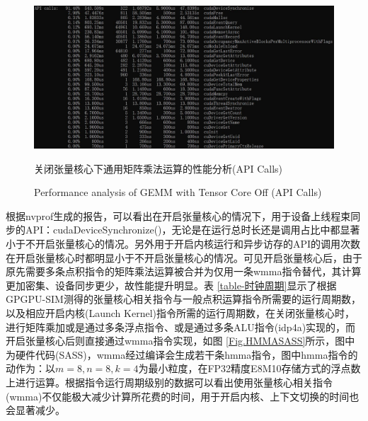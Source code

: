 \begin{figure}
	\centering
	\includegraphics[width=15cm]{figures/GEMM-NOTF.jpg}
	\renewcommand{\thefigure}{\arabic{section}-\arabic{figure} }
	\renewcommand{\figurename}{图}
	\caption{关闭张量核心下通用矩阵乘法运算的性能分析(API Calls)}
	\addtocounter{figure}{-1}
	\renewcommand{\thefigure}{\arabic{section}-\arabic{figure} }
	\renewcommand{\figurename}{Figure}
	\caption{Performance analysis of GEMM with Tensor Core Off (API Calls)}
	\label{Fig.GEMMPROFNOTF}
\end{figure}
\par 根据nvprof生成的报告，可以看出在开启张量核心的情况下，用于设备上线程束同步的API：cudaDeviceSynchronize()，无论是在运行总时长还是调用占比中都显著小于不开启张量核心的情况。另外用于开启内核运行和异步访存的API的调用次数在开启张量核心时都明显小于不开启张量核心的情况。可见开启张量核心后，由于原先需要多条点积指令的矩阵乘法运算被合并为仅用一条wmma指令替代，其计算更加密集、设备同步更少，故性能提升明显。表 \ref{table-时钟周期}显示了根据GPGPU-SIM测得的张量核心相关指令与一般点积运算指令所需要的运行周期数，以及相应开启内核(Launch Kernel)指令所需的运行周期数，在关闭张量核心时，进行矩阵乘加或是通过多条浮点指令、或是通过多条ALU指令(idp4a)实现的，而开启张量核心后则直接通过wmma指令实现，如图 \ref{Fig.HMMASASS}所示，图中为硬件代码(SASS)，wmma经过编译会生成若干条hmma指令，图中hmma指令的动作为：以$ m=8,n=8,k=4 $为最小粒度，在FP32精度E8M10存储方式的浮点数上进行运算。根据指令运行周期级别的数据可以看出使用张量核心相关指令(wmma)不仅能极大减少计算所花费的时间，用于开启内核、上下文切换的时间也会显著减少。
